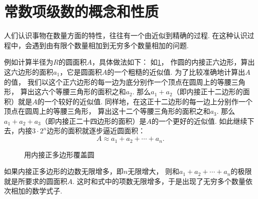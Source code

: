 \section{常数项级数的概念和性质}
人们认识事物在数量方面的特性，往往有一个由近似到精确的过程.
在这种认识过程中，会遇到由有限个数量相加到无穷多个数量相加的问题.

例如计算半径为\(R\)的圆面积\(A\)，具体做法如下：
如\cref{figure:无穷级数.用内接正多边形覆盖圆}，
作圆的内接正六边形，算出这六边形的面积\(a_1\)，它是圆面积\(A\)的一个粗糙的近似值.
为了比较准确地计算出\(A\)的值，
我们以这个正六边形的每一边为底分别作一个顶点在圆周上的等腰三角形，
算出这六个等腰三角形的面积之和\(a_2\).
那么\(a_1+a_2\)（即内接正十二边形的面积）就是\(A\)的一个较好的近似值.
同样地，在这正十二边形的每一边上分别作一个顶点在圆周上的等腰三角形，
算出这十二个等腰三角形的面积之和\(a_3\).
那么\(a_1+a_2+a_3\)（即内接正二十四边形的面积）是\(A\)的一个更好的近似值.
如此继续下去，内接\(3\cdot2^n\)边形的面积就逐步逼近圆面积：\begin{equation*}
	A \approx a_1 + a_2 + \dotsb + a_n.
\end{equation*}

\begin{figure}[h]
	\centering
	\caption{用内接正多边形覆盖圆}
	\label{figure:无穷级数.用内接正多边形覆盖圆}
\end{figure}

如果内接正多边形的边数无限增多，即\(n\)无限增大，
则和\(a_1+a_2+\dotsb+a_n\)的极限就是所要求的圆面积\(A\).
这时和式中的项数无限增多，于是出现了无穷多个数量依次相加的数学式子.

